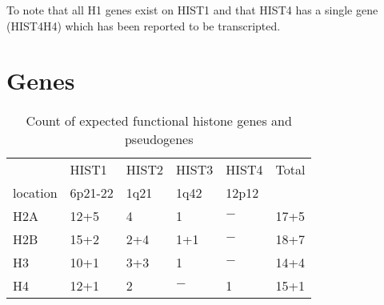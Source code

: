 \documentclass[10pt,a4paper,draft]{article}
\begin{document}
    To note that all H1 genes exist on HIST1 and that HIST4 has a single gene (HIST4H4) which has been reported to be transcripted.

  \section{Genes}
    \begin{table}
      \centering
      \begin{tabular}{l | l | l | l | l | l }
        \null & HIST1 & HIST2 & HIST3 & HIST4 & Total \\
        location & 6p21-22 & 1q21 & 1q42 & 12p12 & \null \\
        \hline
        H2A   & 12+5      & 4         & 1         & $-$       & 17+5  \\
        H2B   & 15+2      & 2+4       & 1+1       & $-$       & 18+7  \\
        H3    & 10+1      & 3+3       & 1         & $-$       & 14+4  \\
        H4    & 12+1      & 2         & $-$       & 1         & 15+1  \\
      \end{tabular}
      \caption{Count of expected functional histone genes and pseudogenes}
      \label{tab:histone}
    \end{table}
\end{document}
